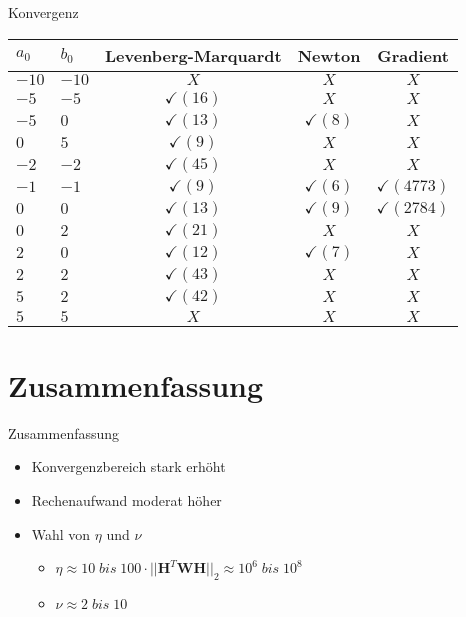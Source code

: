 \documentclass[8pt, t, aspectratio=169,%
]{beamer}
\begin{document}
\begin{frame}{Konvergenz}

\centering
\begin{tabular}{|l|l|c|c|c|}

\hline
$a_0$& $b_0$& Levenberg-Marquardt & Newton & Gradient  \\
\hline
\hline
$-10$& $-10$& $X $ & $X $ & $X$ \\
\hline
$-5$& $-5$& $\checkmark (16)$ & $X $ & $X $ \\
\hline
$-5$& $0$& $\checkmark (13)$ & $\checkmark (8) $ & $X $ \\
\hline
$0$& $5$ & $\checkmark (9)$ & $X $ & $X $ \\
\hline
$-2$& $-2$ &  $\checkmark (45)$ & $X $ & $X $ \\
\hline
$-1$& $-1$ &  $\checkmark (9)$ & $\checkmark (6) $ &  $\checkmark (4773) $ \\
\hline
$0$& $0$ & $\checkmark (13)$ & $\checkmark (9) $ & $\checkmark (2784) $ \\
\hline
$0$& $2$  & $\checkmark (21)$ & $X $ & $X $ \\
\hline
$2$& $0$  & $\checkmark (12)$ & $\checkmark (7) $ & $X $ \\
\hline
$2$& $2$  & $\checkmark (43)$ & $X $ & $X $ \\
\hline
$5$& $2$  & $\checkmark (42)$ & $X $ & $X $ \\
\hline
$5$& $5$  & $X $ & $X $ & $X$ \\
\hline


\end{tabular}
\end{frame}


%
%


\section{Zusammenfassung}

\begin{frame}{Zusammenfassung}\LARGE
	\begin{itemize}
		\item Konvergenzbereich stark erhöht
		\item Rechenaufwand moderat höher
		\item Wahl von $\eta$ und $\nu$
		\begin{itemize}
			\item $\eta \approx 10 \; bis \; 100 \cdot ||\textbf{H}^T  \textbf{W} \textbf{H}||_2 \approx 10^6 \; bis \; 10^8$
			\item $\nu \approx 2 \; bis \; 10 $
		\end{itemize}
	\end{itemize}
\end{frame}

\end{document}

